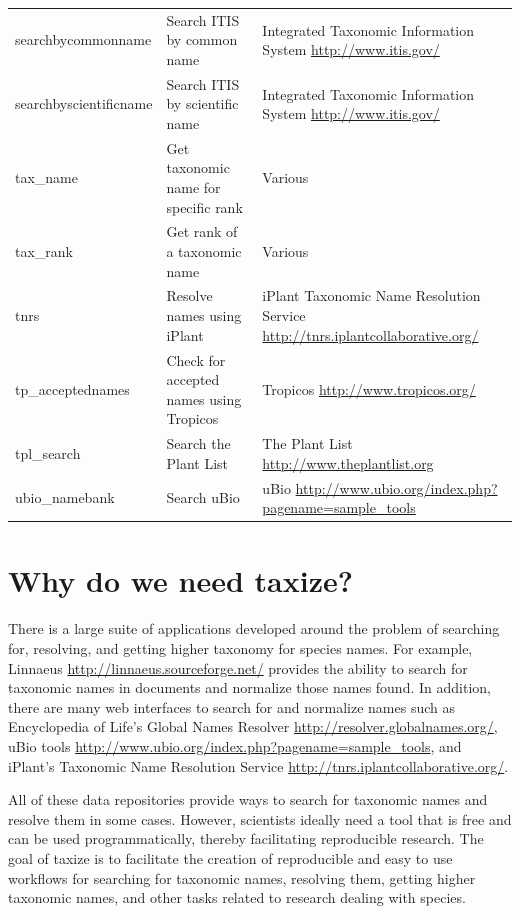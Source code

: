 \documentclass[10pt,a4paper,twocolumn]{article}\usepackage[]{graphicx}\usepackage[]{color}
\begin{document}
\begin{table}[!ht]
\begin{tabular}{|l|L|L|}
searchbycommonname & Search ITIS by common name & Integrated Taxonomic Information System \url{http://www.itis.gov/}  \\
searchbyscientificname & Search ITIS by scientific name & Integrated Taxonomic Information System \url{http://www.itis.gov/}  \\
tax\_name & Get taxonomic name for specific rank & Various  \\
tax\_rank & Get rank of a taxonomic name & Various  \\
tnrs & Resolve names using iPlant & iPlant Taxonomic Name Resolution Service \url{http://tnrs.iplantcollaborative.org/}  \\
tp\_acceptednames & Check for accepted names using Tropicos & Tropicos \url{http://www.tropicos.org/}  \\
tpl\_search & Search the Plant List & The Plant List \url{http://www.theplantlist.org}  \\
ubio\_namebank & Search uBio & uBio \url{http://www.ubio.org/index.php?pagename=sample_tools}  \\
\hline
\end{tabular}
\label{tab:a}
\end{table}


\section*{Why do we need taxize?}

There is a large suite of applications developed around the problem of searching for, resolving, and getting higher taxonomy for species names. For example, Linnaeus \url{http://linnaeus.sourceforge.net/} provides the ability to search for taxonomic names in documents and normalize those names found. In addition, there are many web interfaces to search for and normalize names such as Encyclopedia of Life's Global Names Resolver \url{http://resolver.globalnames.org/}, uBio tools \url{http://www.ubio.org/index.php?pagename=sample_tools}, and iPlant's Taxonomic Name Resolution Service \url{http://tnrs.iplantcollaborative.org/}. 

All of these data repositories provide ways to search for taxonomic names and resolve them in some cases. However, scientists ideally need a tool that is free and can be used programmatically, thereby facilitating reproducible research. The goal of taxize is to facilitate the creation of reproducible and easy to use workflows for searching for taxonomic names, resolving them, getting higher taxonomic names, and other tasks related to research dealing with species.
 
\end{document}

